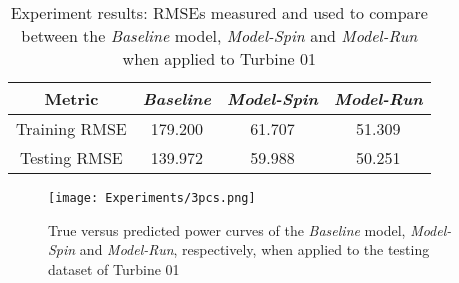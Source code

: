       \begin{table}[H]
        \centering
    \begin{tabular}{|c|c|c|c|}
    \hline
         \textbf{Metric} & \textbf{\emph{Baseline}} & \textbf{\emph{Model-Spin}} & \textbf{\emph{Model-Run}}\\
         \hline
         Training RMSE & 179.200 & 61.707 & 51.309\\
         \hline
         Testing RMSE & 139.972 & 59.988 & 50.251\\
    \hline
    \end{tabular}
    \caption{Experiment results: RMSEs measured and used to compare between the \emph{Baseline} model, \emph{Model-Spin} and \emph{Model-Run} when applied to Turbine 01}
        \label{tab:Experiment IV results}
    \end{table}

    \begin{figure}[H]
        \begin{center}
          \texttt{[image: Experiments/3pcs.png]}
        \end{center}
        \caption{True versus predicted power curves of the \emph{Baseline} model, \emph{Model-Spin} and \emph{Model-Run}, respectively, 
        when applied to the testing dataset of Turbine 01}
        \label{fig:3pcs}
      \end{figure}
    

